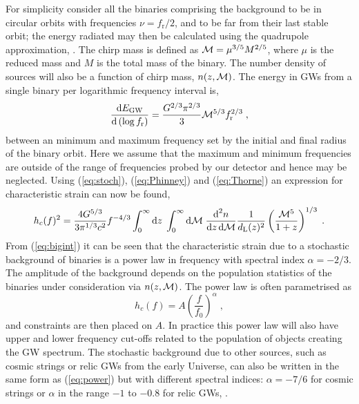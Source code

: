 For simplicity consider all the binaries comprising the background to be in circular orbits with frequencies $\nu=f_{\textrm{r}}/2$, and to be far from their last stable orbit; the energy radiated may then be calculated using the quadrupole approximation, \cite{petersmathews1963}. The chirp mass is defined as ${\cal{M}}=\mu^{3/5}M^{2/5}$, where $\mu$ is the reduced mass and $M$ is the total mass of the binary. The number density of sources will also be a function of chirp mass, $n(z,{\cal{M}})$. The energy in GWs from a single binary per logarithmic frequency interval is, 
\begin{equation}\label{eq:Thorne} \frac{\textrm{d}E_{\textrm{GW}}}{\textrm{d}\left(\log f_{\textrm{r}} \right)}=\frac{G^{2/3}\pi^{2/3}}{3}{\cal{M}}^{5/3}f_{\textrm{r}}^{2/3} \; , \end{equation}
between an minimum and maximum frequency set by the initial and final radius of the binary orbit. Here we assume that the maximum and minimum frequencies are outside of the range of frequencies probed by our detector and hence may be neglected. Using (\ref{eq:stoch}), (\ref{eq:Phinney}) and (\ref{eq:Thorne}) an expression for characteristic strain can now be found, \cite{SesanaVecchioColancino}
\begin{equation}\label{eq:bigint}
h_{c}(f)^{2}=\frac{4G^{5/3}}{3\pi^{1/3}c^{2}}f^{-4/3}\int_{0}^{\infty}\textrm{d}z\;\int_{0}^{\infty}\textrm{d}{\cal{M}}\;\frac{\textrm{d}^{2}n}{\textrm{d}z\,\textrm{d}{\cal{M}}}\frac{1}{d_{\textrm{L}}(z)^{2}}\left( \frac{{\cal{M}}^{5}}{1+z} \right)^{1/3}\; .
\end{equation}
From (\ref{eq:bigint}) it can be seen that the characteristic strain due to a stochastic background of binaries is a power law in frequency with spectral index $\alpha=-2/3$. The amplitude of the background depends on the population statistics of the binaries under consideration via $n(z,{\cal{M}})$. The power law is often parametrised as
\begin{equation}\label{eq:power} h_{c}(f)= A\left(\frac{f}{f_{0}}\right)^{\alpha}\; , \end{equation}
and constraints are then placed on $A$. In practice this power law will also have upper and lower frequency cut-offs related to the population of objects creating the GW spectrum. The stochastic background due to other sources, such as cosmic strings or relic GWs from the early Universe, can also be written in the same form as (\ref{eq:power}) but with different spectral indices: $\alpha=-7/6$ for cosmic strings or $\alpha$ in the range $-1$ to $-0.8$ for relic GWs, \cite{Jenet}.




